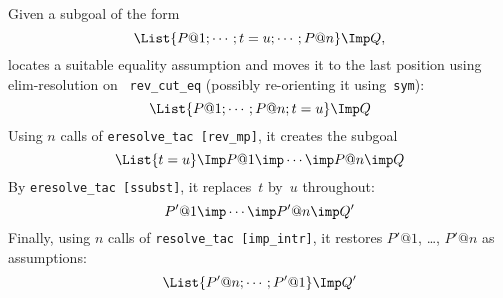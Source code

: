 Given a subgoal of the form
\[ \List{P@1; \cdots ; t=u; \cdots ; P@n} \Imp Q, \]
 locates a suitable equality
assumption and moves it to the last position using elim-resolution on {\tt
rev_cut_eq} (possibly re-orienting it using~{\tt sym}):
\[ \List{P@1; \cdots ; P@n; t=u} \Imp Q \]
Using $n$ calls of \hbox{\tt eresolve_tac [rev_mp]}, it creates the subgoal
\[ \List{t=u} \Imp P@1\imp \cdots \imp P@n \imp Q \]
By \hbox{\tt eresolve_tac [ssubst]}, it replaces~$t$ by~$u$ throughout:
\[ P'@1\imp \cdots \imp P'@n \imp Q' \]
Finally, using $n$ calls of \hbox{\tt resolve_tac [imp_intr]}, it restores
$P'@1$, \ldots, $P'@n$ as assumptions:
\[ \List{P'@n; \cdots ; P'@1} \Imp Q' \]

